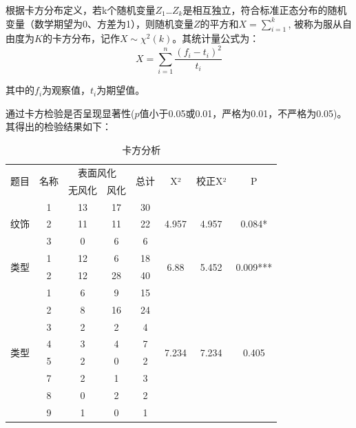 \documentclass[UTF8]{ctexart}
\begin{document}
根据卡方分布定义，若k个随机变量$Z_1$\dots $Z_k$是相互独立，符合标准正态分布的随机变量（数学期望为0、方差为1），则随机变量$Z$的平方和$X=\sum_{i=1}^k$,
被称为服从自由度为$K$的卡方分布，记作$X \sim \chi ^2(k)$。其统计量公式为：
\begin{equation}
	X=\sum_{i=1}^n \frac{(f_i-t_i)^2}{t_i} 	
\end{equation}

其中的$f_i$为观察值，$t_i$为期望值。

通过卡方检验是否呈现显著性($p$值小于0.05或0.01，严格为0.01，不严格为0.05)。其得出的检验结果如下：

\begin{table}[H]
    \centering
	\caption{卡方分析}%
    \begin{tabular}{|c|c|c|c|c|c|c|c|} \hline
	\multirow{2}{*}{题目} & \multirow{2}{*}{名称} & \multicolumn{2}{|c|}{表面风化} & \multirow{2}{*}{总计} & \multirow{2}{*}{X²} & \multirow{2}{*}{校正X²} & \multirow{2}{*}{P} \\ \cline{3-4}
	&  & 无风化 & 风化 &  &  &  &  \\ \hline
	\multirow{3}{*}{纹饰} & 1 & 13 & 17 & 30 & \multirow{3}{*}{4.957} & \multirow{3}{*}{4.957} & \multirow{3}{*}{0.084*} \\ \cline{2-5}
         & 2 & 11 & 11 & 22 & ~ & ~ & ~ \\ \cline{2-5}
         & 3 & 0 & 6 & 6 & ~ & ~ & ~ \\ \hline
	\multirow{2}{*}{类型} & 1 & 12 & 6 & 18 & \multirow{2}{*}{6.88} & \multirow{2}{*}{5.452} & \multirow{2}{*}{0.009***} \\ \cline{2-5} 
        ~ & 2 & 12 & 28 & 40 & ~ & ~ & ~ \\ \hline
    \multirow{8}{*}{类型} & 1 & 6 & 9 & 15 & \multirow{8}{*}{7.234} & \multirow{8}{*}{7.234} & \multirow{8}{*}{0.405} \\ \cline{2-5}
        ~ & 2 & 8 & 16 & 24 & ~ & ~ & ~ \\ \cline{2-5}
        ~ & 3 & 2 & 2 & 4 & ~ & ~ & ~ \\ \cline{2-5}
        ~ & 4 & 3 & 4 & 7 & ~ & ~ & ~ \\\cline{2-5}
        ~ & 5 & 2 & 0 & 2 & ~ & ~ & ~ \\ \cline{2-5}
        ~ & 7 & 2 & 1 & 3 & ~ & ~ & ~ \\ \cline{2-5}
        ~ & 8 & 0 & 2 & 2 & ~ & ~ & ~ \\ \cline{2-5}
        ~ & 9 & 1 & 0 & 1 & ~ & ~ & ~ \\ \hline
    \end{tabular}
\end{table}
\end{document}
